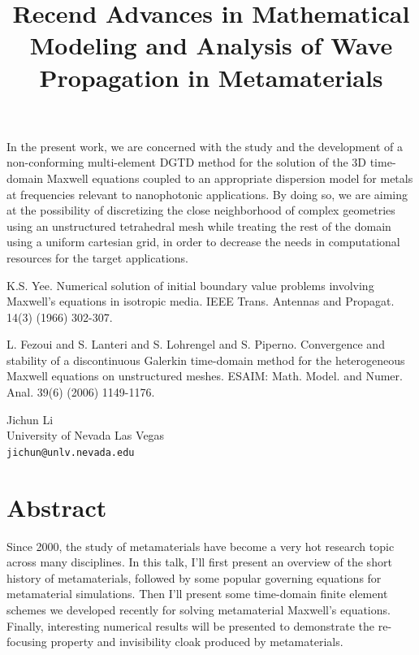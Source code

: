 \documentclass[article, A4, 11pt]{llncs}%
\begin{document}
In  the  present  work,  we  are  concerned with  the  study  and  the development  of a  non-conforming  multi-element DGTD  method for  the solution  of  the  3D  time-domain  Maxwell equations  coupled  to  an appropriate  dispersion model  for metals  at frequencies  relevant to nanophotonic  applications.   By  doing  so,  we  are  aiming  at  the possibility  of   discretizing  the  close   neighborhood  of  complex geometries using  an unstructured tetrahedral mesh  while treating the rest  of  the domain  using  a uniform  cartesian  grid,  in order  to decrease  the   needs  in  computational  resources   for  the  target applications.


\begin{thebibliography}{10}
{\sc K.S. Yee}. {Numerical solution of initial boundary value problems involving Maxwell's equations in isotropic media}. IEEE Trans. Antennas and Propagat. 14(3) (1966) 302-307.

{\sc L. Fezoui and S. Lanteri and S. Lohrengel and S. Piperno}. {Convergence and stability of a discontinuous Galerkin time-domain method for the heterogeneous Maxwell equations on unstructured meshes}. ESAIM: Math. Model. and Numer. Anal. 39(6) (2006) 1149-1176.
\end{thebibliography} %

\title{Recend Advances in Mathematical Modeling and Analysis of Wave Propagation in Metamaterials}
 \author{} \institute{}
\maketitle
\begin{center}
{\large Jichun Li}\\
University of Nevada Las Vegas\\
{\tt jichun@unlv.nevada.edu}
\end{center}

\section*{Abstract}
Since 2000, the study of metamaterials have
become a very hot research topic across many
disciplines. In this talk, I'll first present an overview of
the short history of metamaterials, followed by some
popular governing equations for metamaterial
simulations. Then I'll present some time-domain
finite element schemes we developed recently for
solving metamaterial Maxwell's equations. Finally,
interesting numerical results will be presented to
demonstrate the re-focusing property and invisibility
cloak produced by metamaterials.
\end{document}
